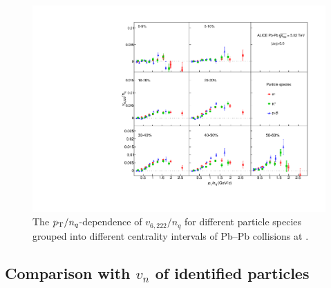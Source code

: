 \documentclass[ALICE,manyauthors]{cernphprep}
\begin{document}
\begin{figure}[!htb]
\begin{center}
\includegraphics[scale=0.82]{figures/scaling/All_v6222_gap00_NCQ_3by3.pdf}

\end{center}
\caption{The $p_{\rm{T}}/n_{q}$-dependence of $v_{6,222}/n_{q}$ for different particle species grouped into different centrality intervals of Pb--Pb collisions at \sNN.}
\label{v6222_NCQ}
\end{figure}


\subsection{Comparison with $v_{n}$ of identified particles}
\label{SubSec:comparewithvn}
\end{document}
